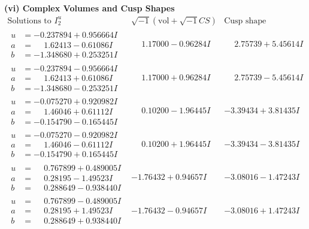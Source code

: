 \documentclass[1p]{elsarticle_modified}
\theoremstyle{definition}
\newcommand{\I}{\sqrt{-1}}
\begin{document}
\newpage\flushleft \textbf{(vi) Complex Volumes and Cusp Shapes}
$$\begin{array}{c|c|c}  
\text{Solutions to }I^u_{2}& \I (\text{vol} + \sqrt{-1}CS) & \text{Cusp shape}\\
 \hline 
\begin{aligned}
u &= -0.237894 + 0.956664 I \\
a &= \phantom{-}1.62413 - 0.61086 I \\
b &= -1.348680 + 0.253251 I\end{aligned}
 & \phantom{-}1.17000 - 0.96284 I & \phantom{-}2.75739 + 5.45614 I \\ \hline\begin{aligned}
u &= -0.237894 - 0.956664 I \\
a &= \phantom{-}1.62413 + 0.61086 I \\
b &= -1.348680 - 0.253251 I\end{aligned}
 & \phantom{-}1.17000 + 0.96284 I & \phantom{-}2.75739 - 5.45614 I \\ \hline\begin{aligned}
u &= -0.075270 + 0.920982 I \\
a &= \phantom{-}1.46046 + 0.61112 I \\
b &= -0.154790 - 0.165445 I\end{aligned}
 & \phantom{-}0.10200 - 1.96445 I & -3.39434 + 3.81435 I \\ \hline\begin{aligned}
u &= -0.075270 - 0.920982 I \\
a &= \phantom{-}1.46046 - 0.61112 I \\
b &= -0.154790 + 0.165445 I\end{aligned}
 & \phantom{-}0.10200 + 1.96445 I & -3.39434 - 3.81435 I \\ \hline\begin{aligned}
u &= \phantom{-}0.767899 + 0.489005 I \\
a &= \phantom{-}0.28195 - 1.49523 I \\
b &= \phantom{-}0.288649 - 0.938440 I\end{aligned}
 & -1.76432 + 0.94657 I & -3.08016 - 1.47243 I \\ \hline\begin{aligned}
u &= \phantom{-}0.767899 - 0.489005 I \\
a &= \phantom{-}0.28195 + 1.49523 I \\
b &= \phantom{-}0.288649 + 0.938440 I\end{aligned}
 & -1.76432 - 0.94657 I & -3.08016 + 1.47243 I \\ \hline\begin{aligned}

\end{aligned}
\end{array}$$
\end{document}
